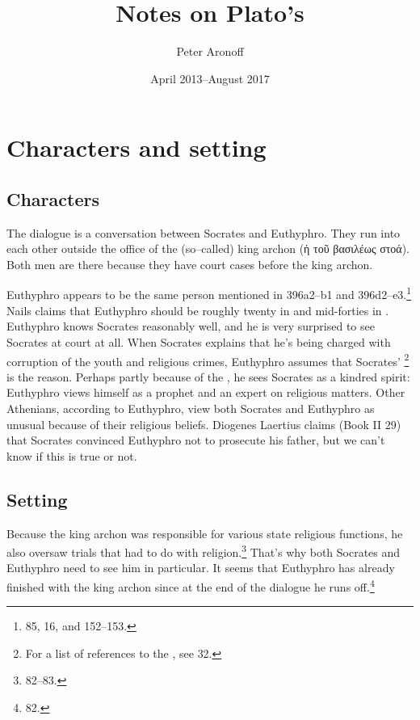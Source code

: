\documentclass[11pt]{article}
\begin{document}
\begin{titlepage}
\title{Notes on Plato's }
\author{Peter Aronoff}
\date{April 2013--August 2017}
\maketitle
\thispagestyle{empty}
\end{titlepage}

\section{Characters and setting}

\subsection{Characters}

The dialogue is a conversation between Socrates and Euthyphro.  They run into each other outside the office of the (so--called) king archon ({\g ἡ τοῦ βασιλέως στοά}).  Both men are there because they have court cases before the king archon.

Euthyphro appears to be the same person mentioned in  396a2--b1 and 396d2--e3.\footnote{\citet{burnet1924} 85, \citet{bailly2003} 16, and \citet{nails2002} 152--153.}  Nails claims that Euthyphro should be roughly twenty in  and mid-forties in .  Euthyphro knows Socrates reasonably well, and he is very surprised to see Socrates at court at all.  When Socrates explains that he's being charged with corruption of the youth and religious crimes, Euthyphro assumes that Socrates' \footnote{For a list of references to the , see \citet{bailly2003} 32.} is the reason.  Perhaps partly because of the , he sees Socrates as a kindred spirit: Euthyphro views himself as a prophet and an expert on religious matters.  Other Athenians, according to Euthyphro, view both Socrates and Euthyphro as unusual because of their religious beliefs.  Diogenes Laertius claims (Book II 29) that Socrates convinced Euthyphro not to prosecute his father, but we can't know if this is true or not. 

\subsection{Setting}

Because the king archon was responsible for various state religious functions, he also oversaw trials that had to do with religion.\footnote{\citet{burnet1924} 82--83.}  That's why both Socrates and Euthyphro need to see him in particular.  It seems that Euthyphro has already finished with the king archon since at the end of the dialogue he runs off.\footnote{\citet{burnet1924} 82.}
\end{document}
